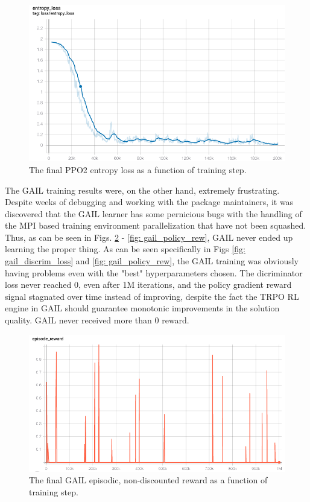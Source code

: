 \begin{figure}[htbp]
\centerline{\includegraphics[width=\linewidth]{Figures/expert_loss.png}}
\caption{The final PPO2 entropy loss as a function of training step.}
\label{fig: expert_loss}
\end{figure}

The GAIL training results were, on the other hand, extremely frustrating. Despite weeks of debugging and working with the package maintainers, it was discovered that the GAIL learner has some pernicious bugs with the handling of the MPI based training environment parallelization that have not been squashed. Thus, as can be seen in Figs. \ref{fig: gail_rew} - \ref{fig: gail_policy_rew}, GAIL never ended up learning the proper thing. As can be seen specifically in Figs \ref{fig: gail_discrim_loss} and \ref{fig: gail_policy_rew}, the GAIL training was obviously having problems even with the "best" hyperparameters chosen. The dicriminator loss never reached 0, even after 1M iterations, and the policy gradient reward signal stagnated over time instead of improving, despite the fact the TRPO RL engine in GAIL should guarantee monotonic improvements in the solution quality. GAIL never received more than 0 reward.

\begin{figure}[htbp]
\centerline{\includegraphics[width=\linewidth]{Figures/gail_episode_reward.png}}
\caption{The final GAIL episodic, non-discounted reward as a function of training step.}
\label{fig: gail_rew}
\end{figure}

